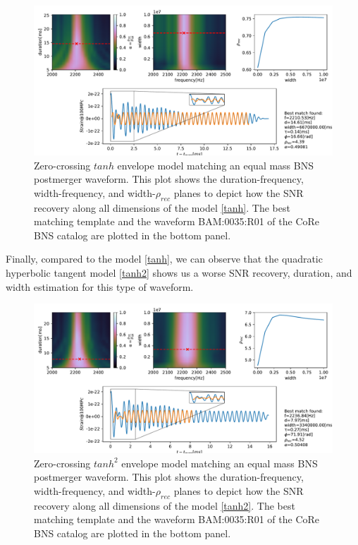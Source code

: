 \begin{figure}[hbt!]
\begin{center}
\includegraphics[width=\textwidth, angle=0]{images/Data_analysis/results/envel_35_tanh.pdf}
\captionsetup{width=0.8\textwidth}
\caption[Zero-crossing $tanh$ envelope model matching an equal mass BNS postmerger waveform]{Zero-crossing $tanh$ envelope model matching an equal mass BNS postmerger waveform. This plot shows the duration-frequency, width-frequency, and width-$\rho_{rec}$ planes to depict how the SNR recovery along all dimensions of the model \ref{tanh}. The best matching template and the waveform BAM:0035:R01 of the CoRe BNS catalog \cite{Dietrich:2018phi} are plotted in the bottom panel.}
\end{center}
\end{figure}

\FloatBarrier

Finally, compared to the model \ref{tanh}, we can observe that the quadratic hyperbolic tangent model \ref{tanh2} shows us a worse SNR recovery, duration, and width estimation for this type of waveform.

\begin{figure}[hbt!]
\begin{center}
\includegraphics[width=\textwidth, angle=0]{images/Data_analysis/results/envel_35_tanh2.pdf}
\captionsetup{width=0.8\textwidth}
\caption[Zero-crossing $tanh^2$ envelope model matching an equal mass BNS postmerger waveform]{Zero-crossing $tanh^2$ envelope model matching an equal mass BNS postmerger waveform. This plot shows the duration-frequency, width-frequency, and width-$\rho_{rec}$ planes to depict how the SNR recovery along all dimensions of the model \ref{tanh2}. The best matching template and the waveform BAM:0035:R01 of the CoRe BNS catalog \cite{Dietrich:2018phi} are plotted in the bottom panel.}
\end{center}
\end{figure}

